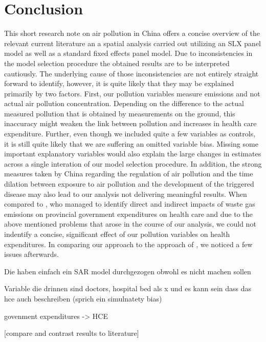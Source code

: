 \documentclass[
]{article}
\begin{document}
	\section{Conclusion} \label{Conclusion}
	
	This short research note on air pollution in China offers a concise overview of the relevant current literature an a spatial analysis carried out utilizing an SLX panel model as well as a standard fixed effects panel model. Due to inconsistencies in the model selection procedure the obtained results are to be interpreted cautiously. The underlying cause of those inconsistencies are not entirely straight forward to identify, however, it is quite likely that they may be explained primarily by two factors. First, our pollution variables measure emissions and not actual air pollution concentration. Depending on the difference to the actual measured pollution that is obtained by measurements on the ground, this inaccuracy might weaken the link between pollution and increases in health care expenditure. Further, even though we included quite a few variables as controls, it is still quite likely that we are suffering an omitted variable bias. Missing some important explanatory variables would also explain the large changes in estimates across a single interation of our model selection procedure. In addition, the strong measures taken by China regarding the regulation of air pollution and the time dilation between exposure to air pollution and the development of the triggered disease may also lead to our analysis not delivering meaningful results. 
	When compared to \cite{zeng2019does}, who managed to identify direct and indirect impacts of waste gas emissions on provincial government expenditures on health care and due to the above mentioned problems that arose in the course of our analysis, we could not indentify a concise, significant effect of our pollution variables on health expenditures.
	In comparing our approach to the approach of \cite{zeng2019does}, we noticed a few issues afterwards. 
	
	Die haben einfach ein SAR model durchgezogen obwohl es nicht machen sollen 
	
	Variable die drinnen sind doctors, hospital bed als x und es kann sein dass das hce auch beschreiben (sprich ein simulnatety bias)
	
	govenment expenditures -> HCE 
	
	
	
	[compare and contrast results to literature]
	
\end{document}

